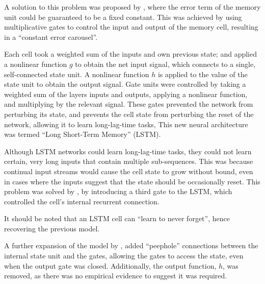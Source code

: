 A solution to this problem was proposed by \cite{Hochreiter:1997:Long}, where
the error term of the memory unit could be guaranteed to be a fixed constant.
This was achieved by using multiplicative gates to control the input and output
of the memory cell, resulting in a ``constant error carousel''.

Each cell took a weighted sum of the inputs and own previous state; and applied
a nonlinear function $g$ to obtain the net input signal, which connects to a
single, self-connected state unit.
A nonlinear function $h$ is applied to the value of the state unit to obtain
the output signal.
Gate units were controlled by taking a weighted sum of the layers inputs and
outputs, applying a nonlinear function, and multiplying by the relevant signal.
These gates prevented the network from perturbing its state, and prevents the
cell state from perturbing the reset of the network, allowing it to learn
long-lag-time tasks,
This new neural architecture was termed ``Long Short-Term Memory'' (LSTM).



Although LSTM networks could learn long-lag-time tasks, they could not learn
certain, very long inputs that contain multiple sub-sequences.
This was because continual input streams would cause the cell state to grow
without bound, even in cases where the inputs suggest that the state should be
occasionally reset.
This problem was solved by \cite{Gers:1999:Learning}, by introducing a third
gate to the LSTM, which controlled the cell's internal recurrent connection.

It should be noted that an LSTM cell can ``learn to never forget'', hence
recovering the previous model.



A further expansion of the model by \cite{Gers:2000:Recurrent}, added
``peephole'' connections between the internal state unit and the gates, allowing
the gates to access the state, even when the output gate was closed.
Additionally, the output function, $h$, was removed, as there was no empirical
evidence to suggest it was required.

